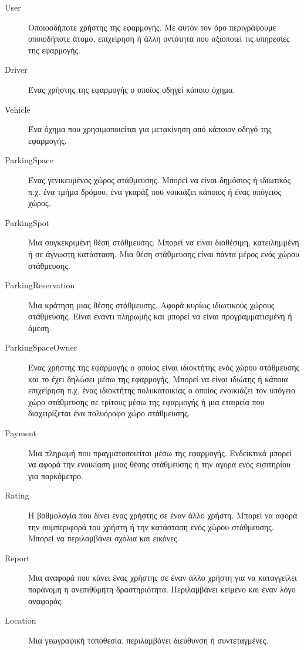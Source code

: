 \documentclass[11pt]{article}
\begin{document}
\begin{description}
    \item[User]
        Οποιοσδήποτε χρήστης της εφαρμογής. Με αυτόν τον όρο περιγράφουμε
        οποιοδήποτε άτομο, επιχείρηση ή άλλη οντότητα που αξιοποιεί τις
        υπηρεσίες της εφαρμογής.
    \item[Driver]
        Ένας χρήστης της εφαρμογής ο οποίος οδηγεί κάποιο όχημα.
    \item[Vehicle]
        Ένα όχημα που χρησιμοποιείται για μετακίνηση από κάποιον οδηγό της
        εφαρμογής.
    \item[ParkingSpace]
        Ένας γενικευμένος χώρος στάθμευσης. Μπορεί να είναι δημόσιος ή ιδιωτικός
        π.χ. ένα τμήμα δρόμου, ένα γκαράζ που νοικιάζει κάποιος ή ένας υπόγειος
        χώρος.
    \item[ParkingSpot]
        Μια συγκεκριμένη θέση στάθμευσης. Μπορεί να είναι διαθέσιμη,
        κατειλημμένη ή σε άγνωστη κατάσταση. Μια θέση στάθμευσης είναι πάντα
        μέρος ενός χώρου στάθμευσης.
    \item[ParkingReservation]
        Μια κράτηση μιας θέσης στάθμευσης. Αφορά κυρίως ιδιωτικούς χώρους
        στάθμευσης. Eίναι έναντι πληρωμής και μπορεί να είναι
        προγραμματισμένη ή άμεση.
    \item[ParkingSpaceOwner]
        Ένας χρήστης της εφαρμογής ο οποίος είναι ιδιοκτήτης ενός χώρου
        στάθμευσης και το έχει δηλώσει μέσω της εφαρμογής. Μπορεί να
        είναι ιδιώτης ή κάποια επιχείρηση π.χ. ένας
        ιδιοκτήτης πολυκατοικίας ο οποίος ενοικιάζει τον υπόγειο χώρο στάθμευσης
        σε τρίτους μέσω της εφαρμογής ή μια εταιρεία που διαχειρίζεται ένα
        πολυόροφο χώρο στάθμευσης.
    \item[Payment]
        Μια πληρωμή που πραγματοποιείται μέσω της εφαρμογής. Ενδεικτικά μπορεί
        να αφορά την ενοικίαση μιας θέσης στάθμευσης ή την αγορά ενός
        εισιτηρίου για παρκόμετρο.
    \item[Rating]
        Η βαθμολογία που δίνει ένας χρήστης σε έναν άλλο χρήστη. Μπορεί να
        αφορά την συμπεριφορά του χρήστη ή την κατάσταση ενός χώρου
        στάθμευσης. Μπορεί να περιλαμβάνει σχόλια και εικόνες.
    \item[Report]
        Μια αναφορά που κάνει ένας χρήστης σε έναν άλλο χρήστη για να
        καταγγείλει παράνομη η ανεπιθύμητη δραστηριότητα. Περιλαμβάνει
        κείμενο και έναν λόγο αναφοράς.
    \item[Location]
        Μια γεωγραφική τοποθεσία, περιλαμβάνει διεύθυνση ή συντεταγμένες.

\end{description}
\end{document}
